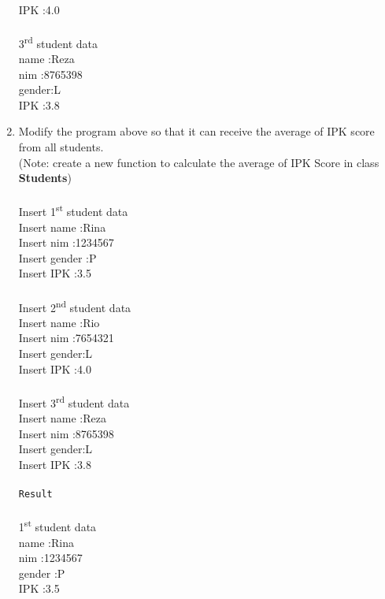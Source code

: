 \documentclass[12pt,titlepage]{article}
\begin{document}
\begin{enumerate}
    \mbox{}\\ IPK :4.0
    \mbox{}\\
    \mbox{}\\ 3\textsuperscript{rd} student data
    \mbox{}\\ name :Reza
    \mbox{}\\ nim :8765398
    \mbox{}\\ gender:L
    \mbox{}\\ IPK :3.8
    \mbox{}\\ 
    \item Modify the program above so that it can receive the average of IPK score from all students.
    \mbox{}\\ (Note: create a new function to calculate the average of IPK Score in class \textbf{Students})
    \mbox{}\\ 
    \mbox{}\\ Insert 1\textsuperscript{st} student data
    \mbox{}\\ Insert name :Rina
    \mbox{}\\ Insert nim :1234567
    \mbox{}\\ Insert gender :P
    \mbox{}\\ Insert IPK :3.5
    \mbox{}\\
    \mbox{}\\ Insert 2\textsuperscript{nd} student data
    \mbox{}\\ Insert name :Rio
    \mbox{}\\ Insert nim :7654321
    \mbox{}\\ Insert gender:L
    \mbox{}\\ Insert IPK :4.0
    \mbox{}\\
    \mbox{}\\ Insert 3\textsuperscript{rd} student data
    \mbox{}\\ Insert name :Reza
    \mbox{}\\ Insert nim :8765398
    \mbox{}\\ Insert gender:L
    \mbox{}\\ Insert IPK :3.8
    \mbox{}\\ 
    \mbox{}\\ \texttt{Result} 
    \mbox{}\\ 
    \mbox{}\\ 1\textsuperscript{st} student data
    \mbox{}\\ name :Rina
    \mbox{}\\ nim :1234567
    \mbox{}\\ gender :P
    \mbox{}\\ IPK :3.5

\end{enumerate}
\end{document}

